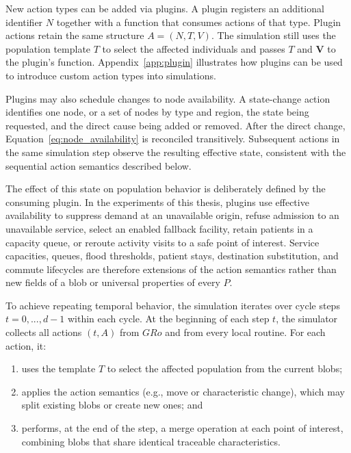 \documentclass[pdflatex,sn-mathphys-num]{sn-jnl}%
\theoremstyle{thmstyleone}%
\theoremstyle{thmstyletwo}%
\theoremstyle{thmstylethree}%
\begin{document}
New action types can be added via plugins. A plugin registers an additional identifier $N$ together with a function that consumes actions of that type. Plugin actions retain the same structure $A=(N,T,V)$. The simulation still uses the population template $T$ to select the affected individuals and passes $T$ and $\bm{V}$ to the plugin’s function. Appendix~\ref{app:plugin} illustrates how plugins can be used to introduce custom action types into simulations.

Plugins may also schedule changes to node availability. A state-change action identifies one node, or a set of nodes by type and region, the state being requested, and the direct cause being added or removed. After the direct change, Equation~\ref{eq:node_availability} is reconciled transitively. Subsequent actions in the same simulation step observe the resulting effective state, consistent with the sequential action semantics described below.

The effect of this state on population behavior is deliberately defined by the consuming plugin. In the experiments of this thesis, plugins use effective availability to suppress demand at an unavailable origin, refuse admission to an unavailable service, select an enabled fallback facility, retain patients in a capacity queue, or reroute activity visits to a safe point of interest. Service capacities, queues, flood thresholds, patient stays, destination substitution, and commute lifecycles are therefore extensions of the action semantics rather than new fields of a blob or universal properties of every $P$.


To achieve repeating temporal behavior, the simulation iterates over cycle steps $t = 0, ..., d-1$ within each cycle. At the beginning of each step 
$t$, the simulator collects all actions $(t,A)$ from $GRo$ and from every local routine. For each action, it:
\begin{enumerate}
    \item uses the template $T$ to select the affected population from the current blobs;
    \item applies the action semantics (e.g., move or characteristic change), which may split existing blobs or create new ones; and
    \item performs, at the end of the step, a merge operation at each point of interest, combining blobs that share identical traceable characteristics.
\end{enumerate}
\end{document}
